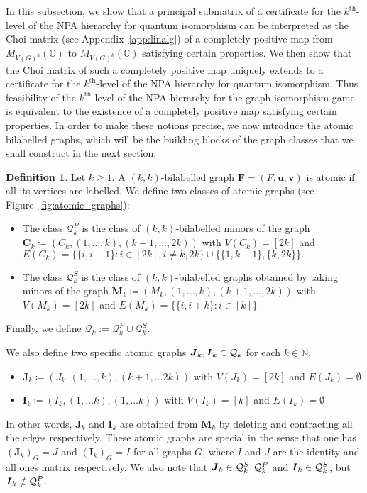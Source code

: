 \documentclass[11pt,a4paper]{article}
\theoremstyle{plain}
\theoremstyle{remark}
\theoremstyle{definition}
\newtheorem{definition}[thm]{Definition}
\begin{document}
In this subsection, we show that a principal submatrix of a certificate for the $k^{\text{th}}$-level of the NPA hierarchy for quantum isomorphism can be interpreted as the Choi matrix (see Appendix~\ref{app:linalg}) of a completely positive map from $M_{V(G)^k}(\mathbb{C})$ to $M_{V(G)^k}(\mathbb{C})$ satisfying certain properties. We then show that the Choi matrix of such a completely positive map uniquely extends to a certificate for the $k^{\text{th}}$-level of the NPA hierarchy for quantum isomorphism. Thus feasibility of the $k^{\text{th}}$-level of the NPA hierarchy for the graph isomorphism game is equivalent to the existence of a completely positive map satisfying certain properties. In order to make these notions precise, we now introduce the atomic bilabelled graphs, which will be the building blocks of the graph classes that we shall construct in the next section. 








\begin{definition}\label{def:atomic-q}
  Let $k\geq 1$.
  A $(k, k)$-bilabelled graph $\boldsymbol{F} = (F, \boldsymbol{u}, \boldsymbol{v})$  is atomic if all its vertices are labelled. We define two classes of atomic graphs (see Figure~\ref{fig:atomic_graphs}):
  \begin{itemize}
    \item The class $\mathcal{Q}_k^P$ is the class of $(k, k)$-bilabelled minors of the graph
      $\boldsymbol{C}_k \coloneqq (C_k, (1,\dots, k), (k+1,\dots,2k))$ with $V(C_k) = [2k]$ and $E(C_k) = \{\{i,i+1\} : i\in[2k], i\neq k,2k\} \cup \{\{1, k+1\}, \{k, 2k\}\}.$
    \item The class $\mathcal{Q}_k^S$ is the class of $(k,k)$-bilabelled graphs obtained by taking minors of the graph
      $\boldsymbol{M}_k \coloneqq (M_k, (1,\dots, k), (k+1,\dots,2k))$ with $V(M_k) = [2k]$ and $E(M_k) = \{\{i, i+k\} : i\in[k]\}$
  \end{itemize}
  Finally, we define $\mathcal{Q}_k := \mathcal{Q}_k^P \cup \mathcal{Q}_k^S$.


  We also define two specific atomic graphs $\boldsymbol{J}_k, \boldsymbol{I}_k \in {\mathcal Q}_k$ for each $k \in \mathbb{N}$. 
  \begin{itemize}
      \item $\boldsymbol{J}_k \coloneq (J_k, (1, \dots, k), (k+1, \dots 2k))$ with $V(J_k) = [2k]$ and $E(J_k) = \emptyset$
      \item $\boldsymbol{I}_k \coloneq (I_k, (1, \dots k), (1, \dots k))$ with $V(I_k) = [k]$ and $E(I_k) = \emptyset$
  \end{itemize}
  In other words, $\boldsymbol{J}_k$ and $\boldsymbol{I}_k$ are obtained from $\boldsymbol{M}_k$ by deleting and contracting all the edges respectively. These atomic graphs are special in the sense that one has $(\boldsymbol{J}_k)_G = J$ and $(\boldsymbol{I}_k)_G = I$ for all graphs $G$, where $I$ and $J$ are the identity and all ones matrix respectively. We also note that $\boldsymbol{J}_k \in {\mathcal Q}_k^S, {\mathcal Q}_k^P$ and $\boldsymbol{I}_k \in {\mathcal Q}_k^S$, but $\boldsymbol{I}_k \notin {\mathcal Q}_k^P$.  
\end{definition}
\end{document}
